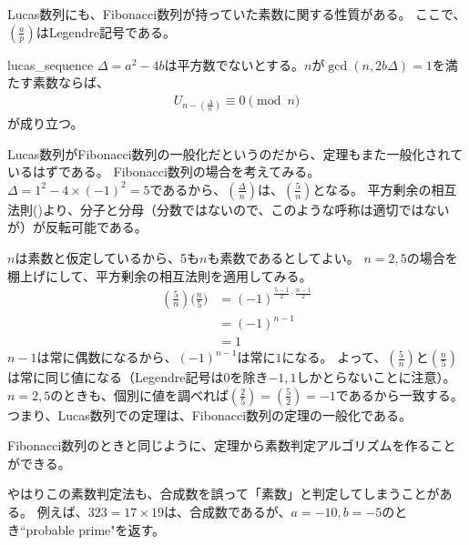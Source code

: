 Lucas数列にも、Fibonacci数列が持っていた素数に関する性質がある。
ここで、$\left(\frac{a}{p}\right)$はLegendre記号である。

\begin{Theo}{}{lucas_sequence}
$\Delta=a^2-4b$は平方数でないとする。$n$が$\gcd(n, 2b\Delta)=1$を満たす素数ならば、
\begin{align*}
U_{n - \left(\frac{\Delta}{n}\right)} \equiv 0 \pmod{n}
\end{align*}
が成り立つ。
\end{Theo}

Lucas数列がFibonacci数列の一般化だというのだから、定理もまた一般化されているはずである。
Fibonacci数列の場合を考えてみる。
$\Delta = 1^2-4\times(-1)^2=5$であるから、$\left(\frac{\Delta}{n}\right)$は、$\left(\frac{5}{n}\right)$となる。
平方剰余の相互法則()より、分子と分母（分数ではないので、このような呼称は適切ではないが）が反転可能である。

$n$は素数と仮定しているから、5も$n$も素数であるとしてよい。
$n=2, 5$の場合を棚上げにして、平方剰余の相互法則を適用してみる。
\begin{align*}
\left(\frac{5}{n}\right) \bigg(\frac{n}{5}\bigg) &= (-1)^{\frac{5-1}{2}\cdot\frac{n-1}{2}}\\
&= (-1)^{n-1}\\
&= 1
\end{align*}
$n-1$は常に偶数になるから、$(-1)^{n-1}$は常に$1$になる。
よって、$\left(\frac{5}{n}\right)$と$\left(\frac{n}{5}\right)$は常に同じ値になる（Legendre記号は$0$を除き$-1,1$しかとらないことに注意）。
$n=2, 5$のときも、個別に値を調べれば$\left(\frac{2}{5}\right) = \left(\frac{5}{2}\right) = -1$であるから一致する。
つまり、Lucas数列での定理は、Fibonacci数列の定理の一般化である。

Fibonacci数列のときと同じように、定理から素数判定アルゴリズムを作ることができる。


やはりこの素数判定法も、合成数を誤って「素数」と判定してしまうことがある。
例えば、$323=17\times19$は、合成数であるが、$a=-10,b=-5$のとき``probable prime"を返す。
